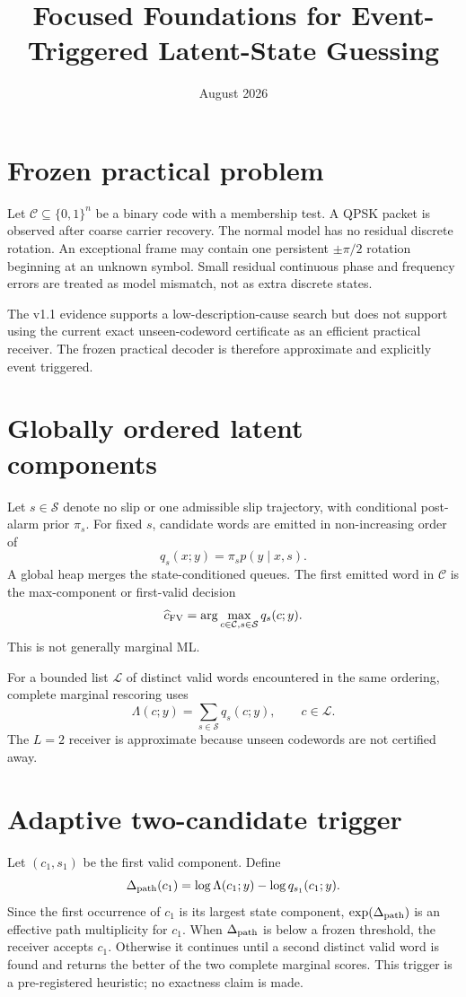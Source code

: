 \documentclass[11pt]{article}
\title{Focused Foundations for Event-Triggered Latent-State Guessing}
\author{}
\date{August 2026}
\begin{document}
\maketitle

\section{Frozen practical problem}
Let $\mathcal C\subseteq\{0,1\}^n$ be a binary code with a membership test.
A QPSK packet is observed after coarse carrier recovery.  The normal model has
no residual discrete rotation.  An exceptional frame may contain one persistent
$\pm\pi/2$ rotation beginning at an unknown symbol.  Small residual continuous
phase and frequency errors are treated as model mismatch, not as extra discrete
states.

The v1.1 evidence supports a low-description-cause search but does not support
using the current exact unseen-codeword certificate as an efficient practical
receiver.  The frozen practical decoder is therefore approximate and
explicitly event triggered.

\section{Globally ordered latent components}
Let $s\in\mathcal S$ denote no slip or one admissible slip trajectory, with
conditional post-alarm prior $\pi_s$.  For fixed $s$, candidate words are emitted
in non-increasing order of
\begin{equation}
 q_s(x;y)=\pi_s p(y\mid x,s).
\end{equation}
A global heap merges the state-conditioned queues.  The first emitted word in
$\mathcal C$ is the max-component or first-valid decision
\begin{equation}
 \widehat c_{\rm FV}=\arg\max_{c\in\mathcal C,s\in\mathcal S}q_s(c;y).
\end{equation}
This is not generally marginal ML.

For a bounded list $\mathcal L$ of distinct valid words encountered in the same
ordering, complete marginal rescoring uses
\begin{equation}
 \Lambda(c;y)=\sum_{s\in\mathcal S}q_s(c;y),\qquad c\in\mathcal L.
\end{equation}
The $L=2$ receiver is approximate because unseen codewords are not certified
away.

\section{Adaptive two-candidate trigger}
Let $(c_1,s_1)$ be the first valid component.  Define
\begin{equation}
 \Delta_{\rm path}(c_1)
 =\log\Lambda(c_1;y)-\log q_{s_1}(c_1;y).
\end{equation}
Since the first occurrence of $c_1$ is its largest state component,
$\exp(\Delta_{\rm path})$ is an effective path multiplicity for $c_1$.
When $\Delta_{\rm path}$ is below a frozen threshold, the receiver accepts
$c_1$.  Otherwise it continues until a second distinct valid word is found and
returns the better of the two complete marginal scores.  This trigger is a
pre-registered heuristic; no exactness claim is made.
\end{document}

